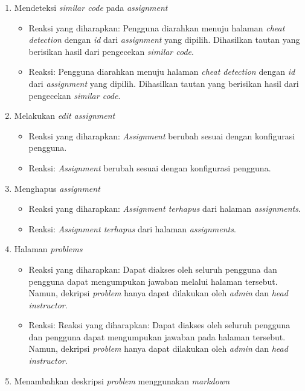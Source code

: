 \begin{enumerate}
\begin{itemize}
	 \end{itemize}
	 \item Mendeteksi \textit{similar code} pada \textit{assignment}
	 \begin{itemize}
	 	\item Reaksi yang diharapkan: Pengguna diarahkan menuju halaman \textit{cheat detection} dengan \textit{id} dari \textit{assignment} yang dipilih. Dihasilkan tautan yang berisikan hasil dari pengecekan \textit{similar code}.
	 	\item Reaksi: Pengguna diarahkan menuju halaman \textit{cheat detection} dengan \textit{id} dari \textit{assignment} yang dipilih. Dihasilkan tautan yang berisikan hasil dari pengecekan \textit{similar code}.
	 \end{itemize}
	 \item Melakukan \textit{edit assignment}
	 \begin{itemize}
	 	\item Reaksi yang diharapkan: \textit{Assignment} berubah sesuai dengan konfigurasi pengguna.
	 	\item Reaksi: \textit{Assignment} berubah sesuai dengan konfigurasi pengguna.
	 \end{itemize}
	 \item Menghapus \textit{assignment}
	 \begin{itemize}
	 	\item Reaksi yang diharapkan: \textit{Assignment terhapus} dari halaman \textit{assignments}.
	 	\item Reaksi: \textit{Assignment terhapus} dari halaman \textit{assignments}.
	 \end{itemize}
	 \item Halaman \textit{problems}
	 \begin{itemize}
	 	\item Reaksi yang diharapkan: Dapat diakses oleh seluruh pengguna dan pengguna dapat mengumpukan jawaban melalui halaman tersebut. Namun, dekripsi \textit{problem} hanya dapat dilakukan oleh \textit{admin} dan \textit{head instructor}.
	 	\item Reaksi: Reaksi yang diharapkan: Dapat diakses oleh seluruh pengguna dan pengguna dapat mengumpukan jawaban pada halaman tersebut. Namun, dekripsi \textit{problem} hanya dapat dilakukan oleh \textit{admin} dan \textit{head instructor}.
	 \end{itemize}
	 \item Menambahkan deskripsi \textit{problem} menggunakan \textit{markdown}
	 \begin{itemize}

\end{itemize}
\end{enumerate}
